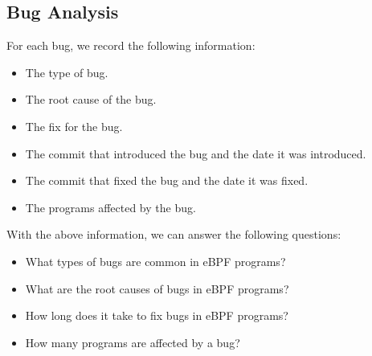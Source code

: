 \subsection{Bug Analysis}
For each bug, we record the following information:
\begin{itemize}
  \item The type of bug.
  \item The root cause of the bug.
  \item The fix for the bug.
  \item The commit that introduced the bug and the date it was introduced.
  \item The commit that fixed the bug and the date it was fixed.
  \item The programs affected by the bug.
\end{itemize}

With the above information, we can answer the following questions:
\begin{itemize}
  \item What types of bugs are common in eBPF programs?
  \item What are the root causes of bugs in eBPF programs?
  \item How long does it take to fix bugs in eBPF programs?
  \item How many programs are affected by a bug?
\end{itemize}




